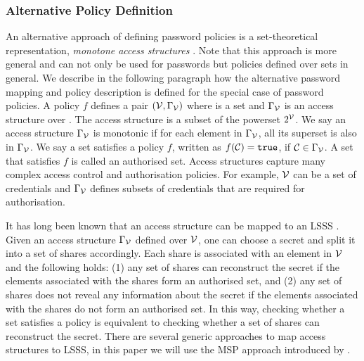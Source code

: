 \subsubsection{Alternative Policy Definition} \label{sec:lsss}
An alternative approach of defining password policies is a set-theoretical representation, \ie \emph{monotone access structures} \cite{ito89}.
Note that this approach is more general and can not only be used for passwords but policies defined over sets in general.
We describe in the following paragraph how the alternative password mapping and policy description is defined for the special case of password policies.
A policy $f$ defines a pair $(\mathcal{V},\Gamma_\mathcal{V})$ where \ServerSet is a set and $\Gamma_\mathcal{V}$ is an access structure over \ServerSet. 
The access structure is a subset of the powerset $2^\mathcal{V}$. 
We say an access structure $\Gamma_\mathcal{V}$ is monotonic if for each element in $\Gamma_\mathcal{V}$, all its superset is also in $\Gamma_\mathcal{V}$. 
We say a set \cC satisfies a policy $f$, written as $f(\mathcal{C})=\mathtt{true}$, if $\mathcal{C}\in \Gamma_\mathcal{V}$. 
A set \cC that satisfies $f$ is called an authorised set. 
Access structures capture many complex access control and authorisation policies. For example, $\mathcal{V}$ can be a set of credentials and $\Gamma_\mathcal{V}$ defines subsets of credentials that are required for authorisation.

It has long been known that an access structure can be mapped to an \ac{LSSS} \cite{ito89,bei96}. 
Given an access structure $\Gamma_\mathcal{V}$ defined over $\mathcal{V}$, one can choose a secret and split it into a set of shares accordingly. 
Each share is associated with an element in $\mathcal{V}$ and the following holds: 
(1) any set of shares can reconstruct the secret if the elements associated with the shares form an authorised set, and 
(2) any set of shares does not reveal any information about the secret if the elements associated with the shares do not form an authorised set.
In this way, checking whether a set satisfies a policy is equivalent to checking whether a set of shares can reconstruct the secret. 
There are several generic approaches to map access structures to \ac{LSSS}, in this paper we will use the \ac{MSP} approach introduced by \citet{bei96}. 

